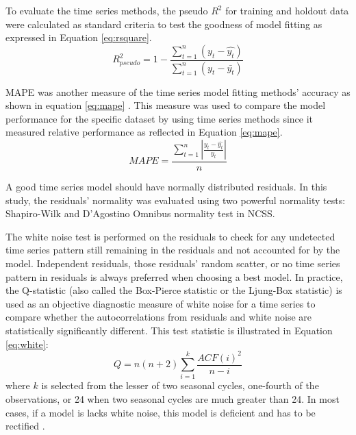 To evaluate the time series methods, the pseudo $R^2$ for training and holdout data were calculated as standard criteria to test the goodness of model fitting as expressed in Equation \ref{eq:rsquare}.
\begin{equation}
	\label{eq:rsquare}
	R_{pseudo}^2=1-\frac{\sum_{t=1}^{n}(y_t-\hat{y_t})}{\sum_{t=1}^{n}(y_t-\bar{y_t})}
\end{equation}

MAPE was another measure of the time series model fitting methods' accuracy as shown in equation \ref{eq:mape} \citep{Hanke1998, Bowerman2005}. This measure was used to compare the model performance for the specific dataset by using time series methods since it measured relative performance \citep{Chu1998} as reflected in Equation \ref{eq:mape}.
\begin{equation}
	\label{eq:mape}
	MAPE=\frac{\sum_{t=1}^{n}\left | \frac{y_t-\hat{y_t}}{y_t} \right |}{n}
\end{equation}

A good time series model should have normally distributed residuals. In this study, the residuals' normality was evaluated using two powerful normality tests: Shapiro-Wilk \citep{Shapiro1965} and D'Agostino Omnibus normality test \citep{d1990} in NCSS.

The white noise test is performed on the residuals to check for any undetected time series pattern still remaining in the residuals and not accounted for by the model. Independent residuals, those residuals' random scatter, or no time series pattern in residuals  \citep{Weisent2010} is always preferred when choosing a best model. In practice, the Q-statistic (also called the Box-Pierce statistic or the Ljung-Box statistic) is used as an objective diagnostic measure of white noise for a time series to compare whether the autocorrelations from residuals and white noise are statistically significantly different. This test statistic is illustrated in Equation \ref{eq:white}:
\begin{equation}
	\label{eq:white}
	Q=n(n+2)\sum_{i=1}^k{\frac{ACF(i)^2}{n-i}}
\end{equation}
where $k$ is selected from the lesser of two seasonal cycles, one-fourth of the observations, or 24 when two seasonal cycles are much greater than 24. In most cases, if a model is lacks white noise, this model is deficient and has to be rectified \citep{de1998}. 
